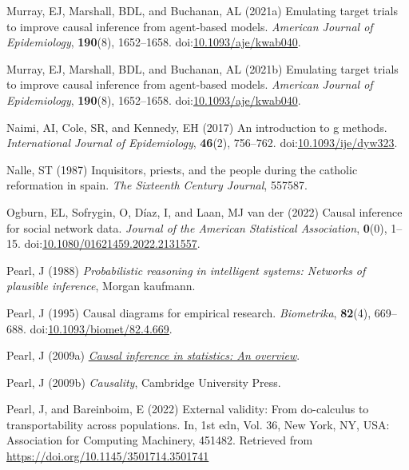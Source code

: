\documentclass[
  singlecolumn]{article}
\newlength{\cslhangindent}
\newlength{\cslentryspacingunit} %
\newenvironment{CSLReferences}[2] %
 {%
  \setlength{\parindent}{0pt}
  \ifodd #1
  \let\oldpar\par
  \def\par{\hangindent=\cslhangindent\oldpar}
  \fi
  \setlength{\parskip}{#2\cslentryspacingunit}
 }%
 {}
\begin{document}
\begin{CSLReferences}{1}{0}
\leavevmode{}%
Murray, EJ, Marshall, BDL, and Buchanan, AL (2021a) Emulating target
trials to improve causal inference from agent-based models.
\emph{American Journal of Epidemiology}, \textbf{190}(8), 1652--1658.
doi:\href{https://doi.org/10.1093/aje/kwab040}{10.1093/aje/kwab040}.

\leavevmode{}%
Murray, EJ, Marshall, BDL, and Buchanan, AL (2021b) Emulating target
trials to improve causal inference from agent-based models.
\emph{American Journal of Epidemiology}, \textbf{190}(8), 1652--1658.
doi:\href{https://doi.org/10.1093/aje/kwab040}{10.1093/aje/kwab040}.

\leavevmode{}%
Naimi, AI, Cole, SR, and Kennedy, EH (2017) An introduction to g
methods. \emph{International Journal of Epidemiology}, \textbf{46}(2),
756--762.
doi:\href{https://doi.org/10.1093/ije/dyw323}{10.1093/ije/dyw323}.

\leavevmode{}%
Nalle, ST (1987) Inquisitors, priests, and the people during the
catholic reformation in spain. \emph{The Sixteenth Century Journal},
557587.

\leavevmode{}%
Ogburn, EL, Sofrygin, O, Díaz, I, and Laan, MJ van der (2022) Causal
inference for social network data. \emph{Journal of the American
Statistical Association}, \textbf{0}(0), 1--15.
doi:\href{https://doi.org/10.1080/01621459.2022.2131557}{10.1080/01621459.2022.2131557}.

\leavevmode{}%
Pearl, J (1988) \emph{Probabilistic reasoning in intelligent systems:
Networks of plausible inference}, Morgan kaufmann.

\leavevmode{}%
Pearl, J (1995) Causal diagrams for empirical research.
\emph{Biometrika}, \textbf{82}(4), 669--688.
doi:\href{https://doi.org/10.1093/biomet/82.4.669}{10.1093/biomet/82.4.669}.

\leavevmode{}%
Pearl, J (2009a) \emph{\href{https://doi.org/10.1214/09-SS057}{Causal
inference in statistics: An overview}}.

\leavevmode{}%
Pearl, J (2009b) \emph{Causality}, Cambridge University Press.

\leavevmode{}%
Pearl, J, and Bareinboim, E (2022) External validity: From do-calculus
to transportability across populations. In, 1st edn, Vol. 36, New York,
NY, USA: Association for Computing Machinery, 451482. Retrieved from
\url{https://doi.org/10.1145/3501714.3501741}


\end{CSLReferences}
\end{document}
